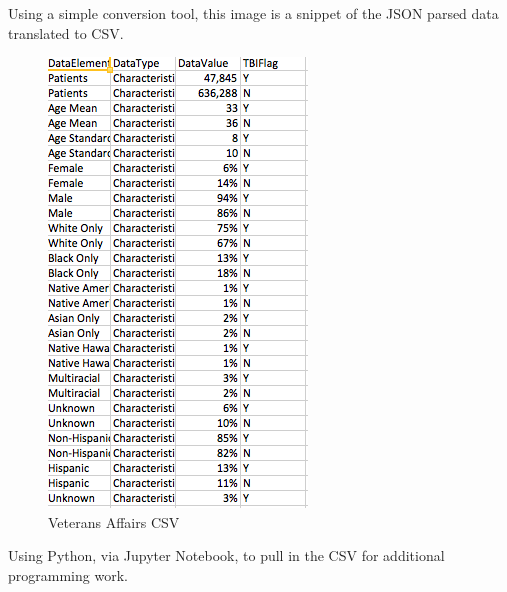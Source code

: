\documentclass[sigconf]{acmart}
\begin{document}
Using a simple conversion tool, this image is a snippet of the JSON parsed data translated to CSV.

\begin{figure}[h]
\includegraphics[width=\columnwidth]{images/graph3.png}
\caption{Veterans Affairs CSV}\label{f:Veterans Affairs CSV}
\end{figure}

Using Python, via Jupyter Notebook, to pull in the CSV for additional programming work.
\end{document}
